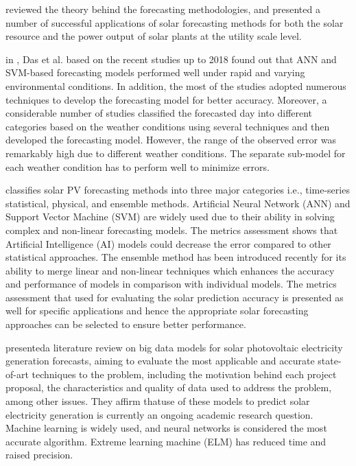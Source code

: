 \cite{INMAN2013535} reviewed the theory behind the forecasting methodologies, and presented a number of successful applications of solar forecasting methods for both the solar resource and the power output of solar plants at the utility scale level.

in \cite{DAS2018912}, Das et al. based on the recent studies up to 2018 found out that ANN and SVM-based forecasting models performed well under rapid and varying environmental conditions.
In addition, the most of the studies adopted numerous techniques to develop the forecasting model for better accuracy.
Moreover, a considerable number of studies classified the forecasted day into different categories based on the weather conditions using several techniques and then developed the forecasting model.
However, the range of the observed error was remarkably high due to different weather conditions.
The separate sub-model for each weather condition has to perform well to minimize errors.

\cite{SOBRI2018459} classifies solar PV forecasting methods into three major categories i.e., time-series statistical, physical, and ensemble methods.
Artificial Neural Network (ANN) and Support Vector Machine (SVM) are widely used due to their ability in solving complex and non-linear forecasting models.
The metrics assessment shows that Artificial Intelligence (AI) models could decrease the error compared to other statistical approaches.
The ensemble method has been introduced recently for its ability to merge linear and non-linear techniques which enhances the accuracy and performance of models in comparison with individual models.
The metrics assessment that used for evaluating the solar prediction accuracy is presented as well for specific applications and hence the appropriate solar forecasting approaches can be selected to ensure better performance.

\cite{DEFREITASVISCONDI201954} presenteda literature review on big data models for solar photovoltaic electricity generation forecasts, aiming to evaluate the most applicable and accurate state-of-art techniques to the problem, including the motivation behind each project proposal, the characteristics and quality of data used to address the problem, among other issues.
They affirm thatuse of these models to predict solar electricity generation is currently an ongoing academic research question.
Machine learning is widely used, and neural networks is considered the most accurate algorithm.
Extreme learning machine (ELM) has reduced time and raised precision.

